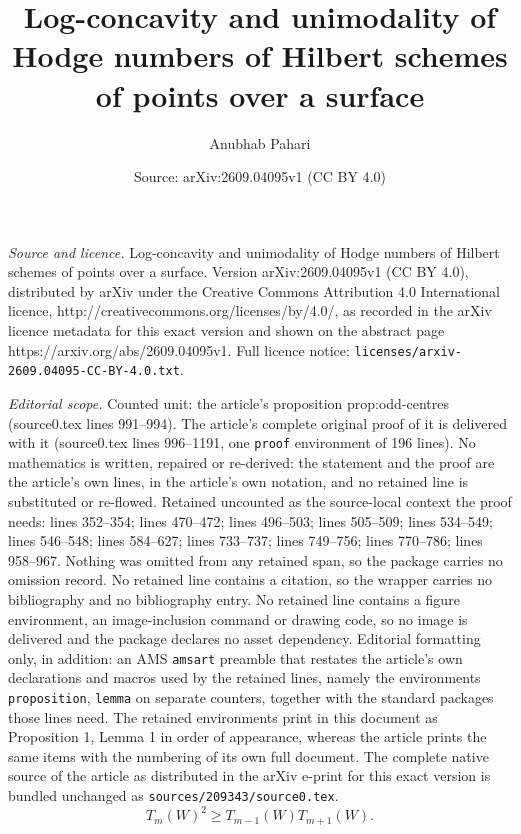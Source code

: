 \documentclass[10pt,a4paper]{amsart}
\title{Log-concavity and unimodality of Hodge numbers of Hilbert schemes of points over a surface}
\author{Anubhab Pahari}
\date{Source: arXiv:2609.04095v1 (CC BY 4.0)}
\begin{document}
\maketitle

\noindent\emph{Source and licence.} Log-concavity and unimodality of Hodge numbers of Hilbert schemes of points over a surface. Version arXiv:2609.04095v1 (CC BY 4.0), distributed by arXiv under the Creative Commons Attribution 4.0 International licence, http://creativecommons.org/licenses/by/4.0/, as recorded in the arXiv licence metadata for this exact version and shown on the abstract page https://arxiv.org/abs/2609.04095v1. Full licence notice: \texttt{licenses/arxiv-2609.04095-CC-BY-4.0.txt}.\par\smallskip

\noindent\textit{Editorial scope.} Counted unit: the article's proposition prop:odd-centres (source0.tex lines 991--994). The article's complete original proof of it is delivered with it (source0.tex lines 996--1191, one \texttt{proof} environment of 196 lines). No mathematics is written, repaired or re-derived: the statement and the proof are the article's own lines, in the article's own notation, and no retained line is substituted or re-flowed.  Retained uncounted as the source-local context the proof needs: lines 352--354; lines 470--472; lines 496--503; lines 505--509; lines 534--549; lines 546--548; lines 584--627; lines 733--737; lines 749--756; lines 770--786; lines 958--967.  Nothing was omitted from any retained span, so the package carries no omission record.  No retained line contains a citation, so the wrapper carries no bibliography and no bibliography entry.  No retained line contains a figure environment, an image-inclusion command or drawing code, so no image is delivered and the package declares no asset dependency.  Editorial formatting only, in addition: an AMS \texttt{amsart} preamble that restates the article's own declarations and macros used by the retained lines, namely the environments \texttt{proposition}, \texttt{lemma} on separate counters, together with the standard packages those lines need.  The retained environments print in this document as Proposition 1, Lemma 1 in order of appearance, whereas the article prints the same items with the numbering of its own full document.  The complete native source of the article as distributed in the arXiv e-print for this exact version is bundled unchanged as \texttt{sources/209343/source0.tex}.
      \begin{equation}\label{eq:universal-tail}
       T_m(W)^2\ge T_{m-1}(W)T_{m+1}(W).
      \end{equation}
\end{document}
